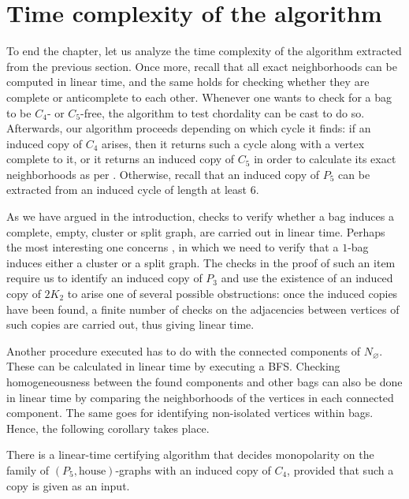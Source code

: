 \section{Time complexity of the algorithm}

To end the chapter, let us analyze the time complexity of the algorithm
extracted from the previous section. Once more, recall that all exact
neighborhoods can be computed in linear time, and the same holds for checking
whether they are complete or anticomplete to each other. Whenever one wants to
check for a bag to be $C_4$- or $C_5$-free, the algorithm to test chordality can
be cast to do so.   Afterwards, our algorithm proceeds depending on which cycle
it finds: if an induced copy of $C_4$ arises, then it returns such a cycle along
with a vertex complete to it, or it returns an induced copy of $C_5$ in order to
calculate its exact neighborhoods as per . Otherwise, recall that
an induced copy of $P_5$ can be extracted from an induced cycle of length at
least $6$.

As we have argued in the introduction, checks to verify whether a bag induces a
complete, empty, cluster or split graph, are carried out in linear time. Perhaps
the most interesting one concerns , in which we need to verify
that a $1$-bag induces either a cluster or a split graph. The checks in the
proof of such an item require us to identify an induced copy of $P_3$ and use
the existence of an induced copy of $2K_2$ to arise one of several possible
obstructions: once the induced copies have been found, a finite number of checks
on the adjacencies between vertices of such copies are carried out, thus giving
linear time.

Another procedure executed has to do with the connected components of
$N_\varnothing$. These can be calculated in linear time by executing a BFS.
Checking homogeneousness between the found components and other bags can also be
done in linear time by comparing the neighborhoods of the vertices in each
connected component. The same goes for identifying non-isolated vertices within
bags. Hence, the following corollary takes place.

\begin{corollary}
    \label{cor:algorithm_c4}
    There is a linear-time certifying algorithm that decides monopolarity on the
    family of $(P_5,\text{house})$-graphs with an induced copy of $C_4$,
    provided that such a copy is given as an input.
\end{corollary}